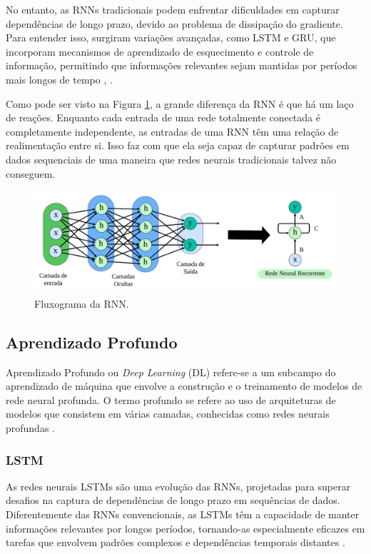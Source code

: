   No entanto, as RNNs tradicionais podem enfrentar dificuldades em capturar dependências de longo prazo, devido ao problema de dissipação do gradiente. Para entender isso, surgiram variações avançadas, como LSTM  e GRU, que incorporam mecanismos de aprendizado de esquecimento e controle de informação, permitindo que informações relevantes sejam mantidas por períodos mais longos de tempo \cite{WANG2023116247}, \cite{ZHAO2023114136}.
 
 Como pode ser visto na Figura \ref{fig:rnn1}, a grande diferença da RNN é que há um laço de reações. Enquanto cada entrada de uma rede totalmente conectada é completamente independente, as entradas de uma RNN têm uma relação de realimentação entre si. Isso faz com que ela seja capaz de capturar padrões em dados sequenciais de uma maneira que redes neurais tradicionais talvez não conseguem.
  
 \begin{figure}[!htb]
 	\centering
 	\caption{Fluxograma da RNN.}
 	\label{fig:rnn1}
 	\includegraphics[width=\linewidth]{Modelos/Figuras/rnn1.pdf}
 
 \end{figure}
 
  \subsection{Aprendizado Profundo}

 Aprendizado Profundo ou \textit{Deep Learning} (DL) refere-se a um subcampo do aprendizado de máquina que envolve a construção e o treinamento de modelos de rede neural profunda. O termo profundo se refere ao uso de arquiteturas de modelos que consistem em várias camadas, conhecidas como redes neurais profundas \cite{KOTHONA2023101149}.
 

 
 \subsubsection{LSTM}
 
 As redes neurais LSTMs são uma evolução das RNNs, projetadas para superar desafios na captura de dependências de longo prazo em sequências de dados. Diferentemente das RNNs convencionais, as LSTMs têm a capacidade de manter informações relevantes por longos períodos, tornando-as especialmente eficazes em tarefas que envolvem padrões complexos e dependências temporais distantes \cite{Zhang2021}.
 
